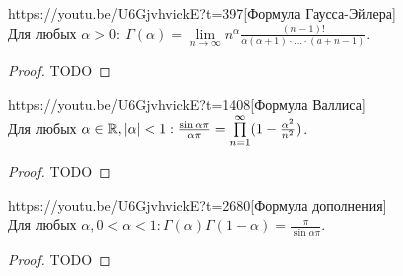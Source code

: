 \begin{linkthm}{https://youtu.be/U6GjvhvickE?t=397}[Формула Гаусса-Эйлера]\ \\
	Для любых $\alpha >0:\ \Gamma(\alpha)=\lim\limits_{n\to\infty}n^\alpha\frac{(n-1)!}{\alpha(\alpha+1)\cdot\ldots\cdot(a+n-1)}$.
\end{linkthm}
\begin{proof}
	TODO
\end{proof}


\begin{linkthm}{https://youtu.be/U6GjvhvickE?t=1408}[Формула Валлиса]\ \\
	Для любых $\alpha \in\mathbb{R}, |\alpha|<1: \frac{\sin\alpha\pi}{\alpha\pi}=\prod\limits_{n=1}^\infty (1-\frac{\alpha^2}{n^2})$.
\end{linkthm}
\begin{proof}
	TODO
\end{proof}

\begin{linkthm}{https://youtu.be/U6GjvhvickE?t=2680}[Формула дополнения]\ \\
	Для любых $\alpha , 0<\alpha<1: \Gamma(\alpha)\Gamma(1-\alpha)=\frac{\pi}{\sin\alpha\pi}$.
\end{linkthm}
\begin{proof}
	TODO
\end{proof}